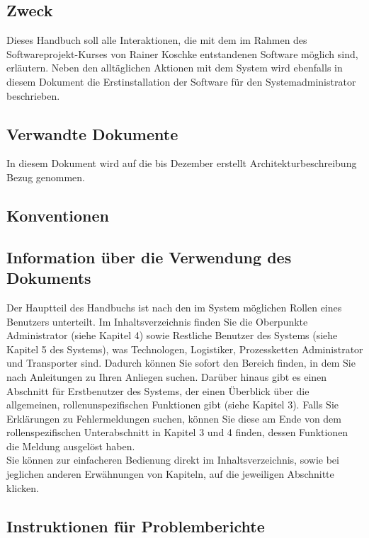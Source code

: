 \documentclass[enabledeprecatedfontcommands,fontsize=12pt,paper=a4,twoside]{scrartcl}
\begin{document}
\subsection{Zweck}
Dieses Handbuch soll alle Interaktionen, die mit dem im Rahmen des Softwareprojekt-Kurses von Rainer Koschke entstandenen Software möglich sind, erläutern. Neben den alltäglichen Aktionen mit dem System wird ebenfalls in diesem Dokument die Erstinstallation der Software für den Systemadministrator beschrieben. \\
\subsection{Verwandte Dokumente}
In diesem Dokument wird auf die bis Dezember erstellt Architekturbeschreibung Bezug genommen. \\
\subsection{Konventionen}
\subsection{Information über die Verwendung des Dokuments}
Der Hauptteil des Handbuchs ist nach den im System möglichen Rollen eines Benutzers unterteilt. Im Inhaltsverzeichnis finden Sie die Oberpunkte Administrator (siehe Kapitel 4) sowie Restliche Benutzer des Systems (siehe Kapitel 5 des Systems), was Technologen, Logistiker, Prozessketten Administrator und Transporter sind. Dadurch können Sie sofort den Bereich finden, in dem Sie nach Anleitungen zu Ihren Anliegen suchen. Darüber hinaus gibt es einen Abschnitt für Erstbenutzer des Systems, der einen Überblick über die allgemeinen, rollenunspezifischen Funktionen gibt (siehe Kapitel 3). Falls Sie Erklärungen zu Fehlermeldungen suchen, können Sie diese am Ende von dem rollenspezifischen Unterabschnitt in Kapitel 3 und 4 finden, dessen Funktionen die Meldung ausgelöst haben. \\
Sie können zur einfacheren Bedienung direkt im Inhaltsverzeichnis, sowie bei jeglichen anderen Erwähnungen von Kapiteln, auf die jeweiligen Abschnitte klicken. \\
\subsection{Instruktionen für Problemberichte}

\end{document}
